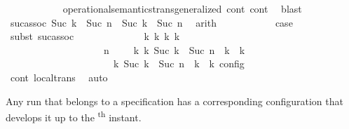 \begin{isabellebody}
\ \ \ \ \ \ \ \ \ \ \isamarkupfalse%
\ operational{\isacharunderscore}semantics{\isacharunderscore}trans{\isacharunderscore}generalized\ cont\ cont{}\ \isamarkupfalse%
\ blast\isanewline
\ \ \ \ \ \ \ \ \isamarkupfalse%
\ \isamarkupfalse%
\ suc{\isacharunderscore}assoc{\isacharcolon}\ {\isacartoucheopen}Suc\ {\isasymdelta}k\ {\isacharplus}\ Suc\ n\ {\isacharequal}\ Suc\ {\isacharparenleft}{\isasymdelta}k\ {\isacharplus}\ Suc\ n{\isacharparenright}{\isacartoucheclose}\ \isamarkupfalse%
\ arith\isanewline
\ \ \ \ \ \ \ \ \isamarkupfalse%
\ \isamarkupfalse%
\ {\isacharquery}case\isanewline
\ \ \ \ \ \ \ \ \ \ \isamarkupfalse%
\ {\isacharparenleft}subst\ suc{\isacharunderscore}assoc{\isacharparenright}\isanewline
\ \ \ \ \ \ \ \ \ \ \ \ \isamarkupfalse%
\ {\isacartoucheopen}{\isasymexists}{\isasymGamma}\isactrlsub k\ {\isasymPsi}\isactrlsub k\ {\isasymPhi}\isactrlsub k\ k{\isachardot}\isanewline
\ \ \ \ \ \ \ \ \ \ \ \ \ \ \ \ \ \ \ {\isacharparenleft}{\isacharparenleft}{\isasymGamma}{\isacharcomma}\ n\ {\isasymturnstile}\ {\isasymPsi}\ {\isasymtriangleright}\ {\isasymPhi}{\isacharparenright}\ {\isasymhookrightarrow}\isactrlbsup k\isactrlesup \ {\isacharparenleft}{\isasymGamma}\isactrlsub k{\isacharcomma}\ Suc\ {\isacharparenleft}{\isasymdelta}k\ {\isacharplus}\ Suc\ n{\isacharparenright}\ {\isasymturnstile}\ {\isasymPsi}\isactrlsub k\ {\isasymtriangleright}\ {\isasymPhi}\isactrlsub k{\isacharparenright}{\isacharparenright}\isanewline
\ \ \ \ \ \ \ \ \ \ \ \ \ \ \ \ \ \ {\isasymand}\ {\isasymrho}\ {\isasymin}\ {\isasymlbrakk}\ {\isasymGamma}\isactrlsub k{\isacharcomma}\ Suc\ {\isasymdelta}k\ {\isacharplus}\ Suc\ n\ {\isasymturnstile}\ {\isasymPsi}\isactrlsub k\ {\isasymtriangleright}\ {\isasymPhi}\isactrlsub k\ {\isasymrbrakk}\isactrlsub c\isactrlsub o\isactrlsub n\isactrlsub f\isactrlsub i\isactrlsub g{\isacartoucheclose}\isanewline
\ \ \ \ \ \ \ \ \ \ \ \ \isamarkupfalse%
\ cont{}\ local{\isachardot}trans\ \isamarkupfalse%
\ auto\isanewline
\ \ \ \ \ \ \ \ \ \ \isamarkupfalse%
\isanewline
\ \ \ \ \isamarkupfalse%
\isanewline
{}\isamarkupfalse%
%
\endisatagproof
{\isafoldproof}%
%
\isadelimproof
%
\endisadelimproof
%
\begin{isamarkuptext}%
Any run that belongs to a specification \isa{{\isasymPsi}} has a corresponding 
  configuration that develops it up to the \textsuperscript{th} instant.%

\end{isamarkuptext}
\end{isabellebody}
